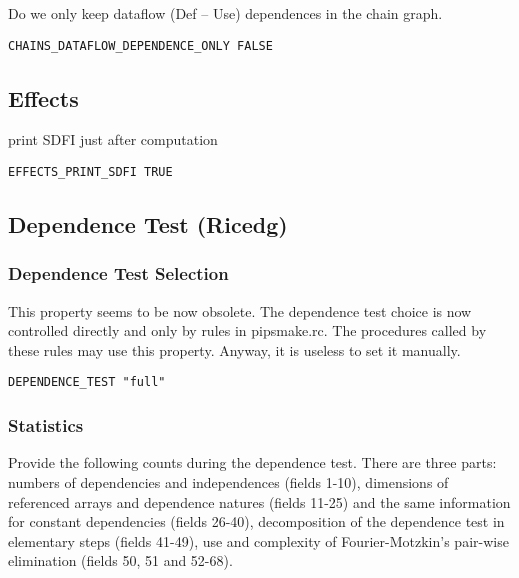 Do we only keep dataflow (Def -- Use) dependences in the chain graph.

\begin{verbatim}
CHAINS_DATAFLOW_DEPENDENCE_ONLY FALSE
\end{verbatim}

\subsection{Effects}

print SDFI just after computation

\begin{verbatim}
EFFECTS_PRINT_SDFI TRUE
\end{verbatim}


\subsection{Dependence Test (Ricedg)}


\subsubsection{Dependence Test Selection}

This property seems to be now obsolete. The dependence test choice is
now controlled directly and only by rules in pipsmake.rc. The procedures
called by these rules may use this property. Anyway, it is useless to
set it manually.

\begin{verbatim}
DEPENDENCE_TEST "full"
\end{verbatim}

\subsubsection{Statistics}

Provide the following counts during the dependence test. There are three
parts: numbers of dependencies and independences (fields 1-10),
dimensions of referenced arrays and dependence natures (fields 11-25)
and the same information for constant dependencies (fields 26-40),
decomposition of the dependence test in elementary steps (fields 41-49),
use and complexity of Fourier-Motzkin's pair-wise elimination (fields
50, 51 and 52-68).

